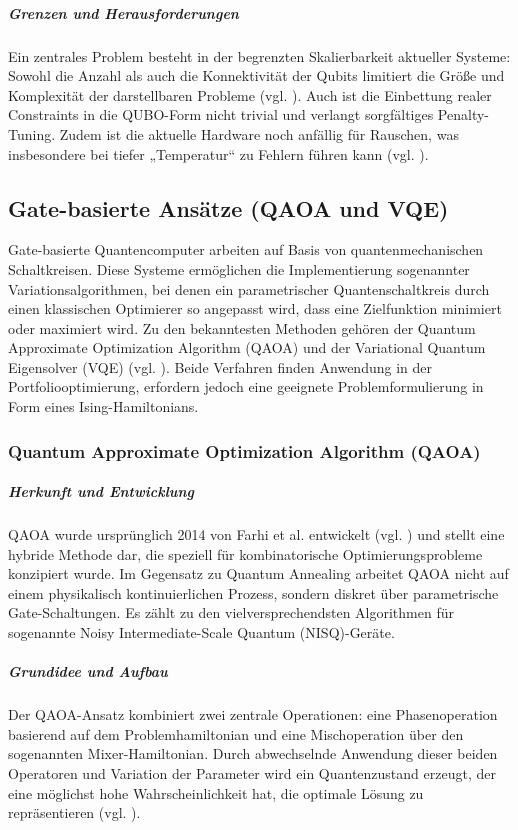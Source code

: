 \subparagraph{Grenzen und Herausforderungen}
Ein zentrales Problem besteht in der begrenzten Skalierbarkeit aktueller Systeme: Sowohl die Anzahl als auch die Konnektivität der Qubits limitiert die Größe und Komplexität der darstellbaren Probleme (vgl. \cite{sakuler_real-world_2025}). Auch ist die Einbettung realer Constraints in die QUBO-Form nicht trivial und verlangt sorgfältiges Penalty-Tuning. Zudem ist die aktuelle Hardware noch anfällig für Rauschen, was insbesondere bei tiefer „Temperatur“ zu Fehlern führen kann (vgl. \cite{rosenberg_finding_2016, sakuler_real-world_2025}).

\subsection{Gate-basierte Ansätze (QAOA und VQE)}

Gate-basierte Quantencomputer arbeiten auf Basis von quantenmechanischen Schaltkreisen. Diese Systeme ermöglichen die Implementierung sogenannter Variationsalgorithmen, bei denen ein parametrischer Quantenschaltkreis durch einen klassischen Optimierer so angepasst wird, dass eine Zielfunktion minimiert oder maximiert wird. Zu den bekanntesten Methoden gehören der Quantum Approximate Optimization Algorithm (QAOA) und der Variational Quantum Eigensolver (VQE) (vgl. \cite{buonaiuto_best_2023, brandhofer_benchmarking_2022}). Beide Verfahren finden Anwendung in der Portfoliooptimierung, erfordern jedoch eine geeignete Problemformulierung in Form eines Ising-Hamiltonians.

\subsubsection{Quantum Approximate Optimization Algorithm (QAOA)}

\subparagraph{Herkunft und Entwicklung}
QAOA wurde ursprünglich 2014 von Farhi et al. entwickelt (vgl. \cite{farhi_quantum_2014}) und stellt eine hybride Methode dar, die speziell für kombinatorische Optimierungsprobleme konzipiert wurde. Im Gegensatz zu Quantum Annealing arbeitet QAOA nicht auf einem physikalisch kontinuierlichen Prozess, sondern diskret über parametrische Gate-Schaltungen. Es zählt zu den vielversprechendsten Algorithmen für sogenannte Noisy Intermediate-Scale Quantum (NISQ)-Geräte.

\subparagraph{Grundidee und Aufbau}
Der QAOA-Ansatz kombiniert zwei zentrale Operationen: eine Phasenoperation basierend auf dem Problemhamiltonian und eine Mischoperation über den sogenannten Mixer-Hamiltonian. Durch abwechselnde Anwendung dieser beiden Operatoren und Variation der Parameter wird ein Quantenzustand erzeugt, der eine möglichst hohe Wahrscheinlichkeit hat, die optimale Lösung zu repräsentieren (vgl. \cite{brandhofer_benchmarking_2022}).


